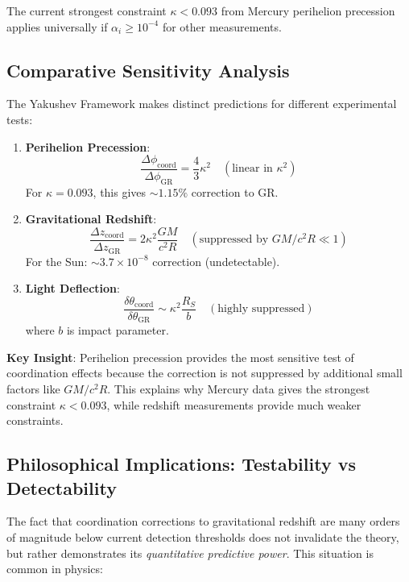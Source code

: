 \documentclass[11pt,a4paper]{article}
\begin{document}
	The current strongest constraint $\kappa < 0.093$ from Mercury perihelion precession applies universally if $\alpha_i \geq 10^{-4}$ for other measurements.
	
	\subsection{Comparative Sensitivity Analysis}
	\label{subsec:comparative-sensitivity}
	
	The Yakushev Framework makes distinct predictions for different experimental tests:
	
	\begin{enumerate}
		\item \textbf{Perihelion Precession}: 
		\[
		\frac{\Delta\phi_{\text{coord}}}{\Delta\phi_{\text{GR}}} = \frac{4}{3}\kappa^2 \quad (\text{linear in }\kappa^2)
		\]
		For $\kappa = 0.093$, this gives $\sim 1.15\%$ correction to GR.
		
		\item \textbf{Gravitational Redshift}:
		\[
		\frac{\Delta z_{\text{coord}}}{\Delta z_{\text{GR}}} = 2\kappa^2 \frac{GM}{c^2R} \quad (\text{suppressed by }GM/c^2R \ll 1)
		\]
		For the Sun: $\sim 3.7\times10^{-8}$ correction (undetectable).
		
		\item \textbf{Light Deflection}:
		\[
		\frac{\delta\theta_{\text{coord}}}{\delta\theta_{\text{GR}}} \sim \kappa^2 \frac{R_S}{b} \quad (\text{highly suppressed})
		\]
		where $b$ is impact parameter.
	\end{enumerate}
	
	\textbf{Key Insight}: Perihelion precession provides the most sensitive test of coordination effects because the correction is not suppressed by additional small factors like $GM/c^2R$. This explains why Mercury data gives the strongest constraint $\kappa < 0.093$, while redshift measurements provide much weaker constraints.
	
	\subsection{Philosophical Implications: Testability vs Detectability}
	\label{subsec:philosophy-testability}
	
	The fact that coordination corrections to gravitational redshift are many orders of magnitude below current detection thresholds does not invalidate the theory, but rather demonstrates its \emph{quantitative predictive power}. This situation is common in physics:
	
\end{document}
